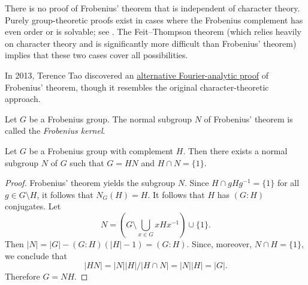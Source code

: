 There is no proof of Frobenius’ theorem that is  independent of character theory. Purely group-theoretic proofs exist in cases where the Frobenius complement has even order or is solvable; see
\cite[Remark 16.2]{MR1645304}. The Feit--Thompson theorem (which relies heavily on character theory and is significantly more difficult than Frobenius’ theorem) implies that these two cases cover all possibilities. 

In 2013, Terence Tao discovered an \href{https://terrytao.wordpress.com/2013/05/24/a-fourier-analytic-proof-of-frobeniuss-theorem/}{alternative 
Fourier-analytic
proof} of Frobenius’ theorem, though it resembles the original character-theoretic approach.

\begin{optional}
 
\begin{definition}
  Let $G$ be a Frobenius group. The normal subgroup 
  $N$ of Frobenius' theorem is called the \emph{Frobenius kernel}. 
\end{definition}

\begin{corollary}
  Let $G$ be a Frobenius group with complement $H$. 
  Then there exists a normal subgroup $N$ of $G$ 
  such that 
  $G=HN$ and $H\cap N=\{1\}$.
\end{corollary}

\begin{proof}
  Frobenius' theorem yields the subgroup $N$. Since 
  $H\cap gHg^{-1}=\{1\}$ for all $g\in G\setminus H$, 
  it follows that 
  $N_G(H)=H$. It follows that $H$
  has $(G:H)$ conjugates. 
  Let 
  \[
  N=\left( G\setminus\bigcup_{x\in G}xHx^{-1}\right)\cup\{1\}.
  \]
  Then  
  $|N|=|G|-(G:H)(|H|-1)=(G:H)$.
  Since, moreover, $N\cap H=\{1\}$, we conclude that
  \[
  |HN|=|N||H|/|H\cap N|=|N||H|=|G|.
  \]
  Therefore $G=NH$.
\end{proof}

\end{optional}
